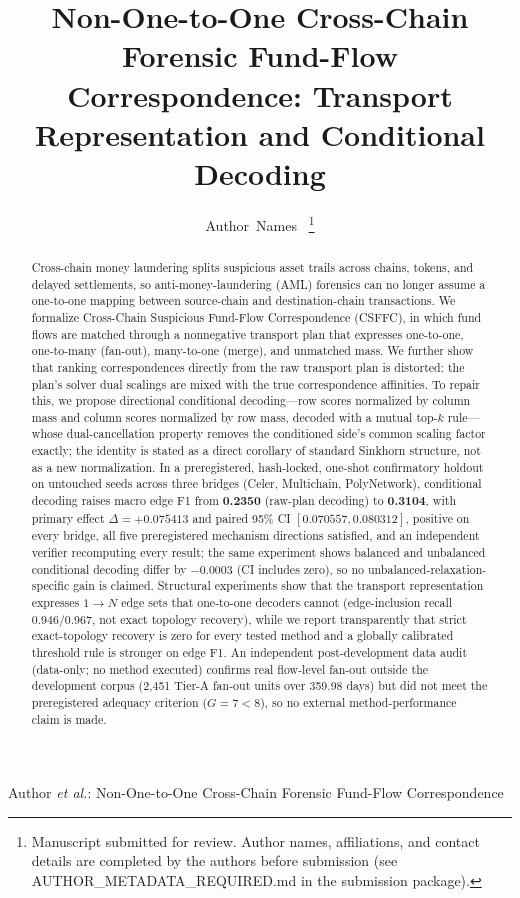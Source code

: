\documentclass[journal]{IEEEtran}
\begin{document}
\title{Non-One-to-One Cross-Chain Forensic Fund-Flow Correspondence: Transport Representation and Conditional Decoding}

\author{Author~Names~%
\thanks{Manuscript submitted for review. Author names, affiliations, and contact details are completed by the authors before submission (see AUTHOR\_METADATA\_REQUIRED.md in the submission package).}%
}

%
{Author \MakeLowercase{\textit{et al.}}: Non-One-to-One Cross-Chain Forensic Fund-Flow Correspondence}

\maketitle

\begin{abstract}
Cross-chain money laundering splits suspicious asset trails across chains, tokens, and delayed settlements, so anti-money-laundering (AML) forensics can no longer assume a one-to-one mapping between source-chain and destination-chain transactions. We formalize Cross-Chain Suspicious Fund-Flow Correspondence (CSFFC), in which fund flows are matched through a nonnegative transport plan that expresses one-to-one, one-to-many (fan-out), many-to-one (merge), and unmatched mass. We further show that ranking correspondences directly from the raw transport plan is distorted: the plan's solver dual scalings are mixed with the true correspondence affinities. To repair this, we propose directional conditional decoding---row scores normalized by column mass and column scores normalized by row mass, decoded with a mutual top-$k$ rule---whose dual-cancellation property removes the conditioned side's common scaling factor exactly; the identity is stated as a direct corollary of standard Sinkhorn structure, not as a new normalization. In a preregistered, hash-locked, one-shot confirmatory holdout on untouched seeds across three bridges (Celer, Multichain, PolyNetwork), conditional decoding raises macro edge F1 from \textbf{0.2350} (raw-plan decoding) to \textbf{0.3104}, with primary effect \textbf{$\Delta = +0.075413$} and paired 95\% CI \textbf{$[0.070557, 0.080312]$}, positive on every bridge, all five preregistered mechanism directions satisfied, and an independent verifier recomputing every result; the same experiment shows balanced and unbalanced conditional decoding differ by $-0.0003$ (CI includes zero), so no unbalanced-relaxation-specific gain is claimed. Structural experiments show that the transport representation expresses $1{\to}N$ edge sets that one-to-one decoders cannot (edge-inclusion recall 0.946/0.967, not exact topology recovery), while we report transparently that strict exact-topology recovery is zero for every tested method and a globally calibrated threshold rule is stronger on edge F1. An independent post-development data audit (data-only; no method executed) confirms real flow-level fan-out outside the development corpus (2{,}451 Tier-A fan-out units over 359.98 days) but did not meet the preregistered adequacy criterion ($G = 7 < 8$), so no external method-performance claim is made.
\end{abstract}
\end{document}

